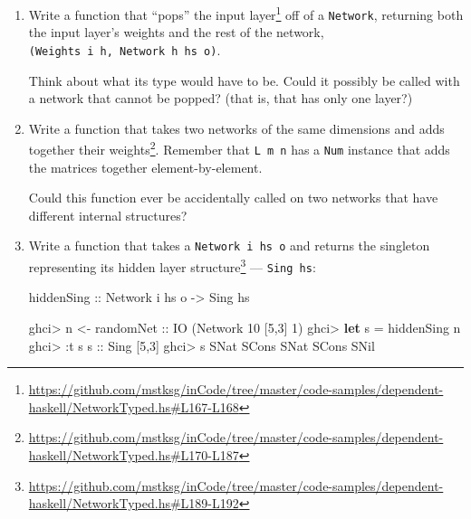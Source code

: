 \documentclass[]{article}
\newenvironment{Shaded}{}{}
\newcommand{\DataTypeTok}[1]{\textcolor[rgb]{0.56,0.13,0.00}{#1}}
\newcommand{\DecValTok}[1]{\textcolor[rgb]{0.25,0.63,0.44}{#1}}
\newcommand{\KeywordTok}[1]{\textcolor[rgb]{0.00,0.44,0.13}{\textbf{#1}}}
\newcommand{\NormalTok}[1]{#1}
\newcommand{\OperatorTok}[1]{\textcolor[rgb]{0.40,0.40,0.40}{#1}}
\newcommand{\OtherTok}[1]{\textcolor[rgb]{0.00,0.44,0.13}{#1}}
\renewcommand{\href}[2]{#2\footnote{\url{#1}}}
\begin{document}
\begin{enumerate}
\def\labelenumi{\arabic{enumi}.}
\item
  Write a function that
  \href{https://github.com/mstksg/inCode/tree/master/code-samples/dependent-haskell/NetworkTyped.hs\#L167-L168}{``pops''
  the input layer} off of a \texttt{Network}, returning both the input layer's
  weights and the rest of the network,
  \texttt{(Weights\ i\ h,\ Network\ h\ hs\ o)}.

  Think about what its type would have to be. Could it possibly be called with a
  network that cannot be popped? (that is, that has only one layer?)
\item
  Write a
  \href{https://github.com/mstksg/inCode/tree/master/code-samples/dependent-haskell/NetworkTyped.hs\#L170-L187}{function
  that takes two networks of the same dimensions and adds together their
  weights}. Remember that \texttt{L\ m\ n} has a \texttt{Num} instance that adds
  the matrices together element-by-element.

  Could this function ever be accidentally called on two networks that have
  different internal structures?
\item
  Write a function that takes a \texttt{Network\ i\ hs\ o} and
  \href{https://github.com/mstksg/inCode/tree/master/code-samples/dependent-haskell/NetworkTyped.hs\#L189-L192}{returns
  the singleton representing its hidden layer structure} --- \texttt{Sing\ hs}:

\begin{Shaded}
\begin{Highlighting}[]
\OtherTok{hiddenSing ::} \DataTypeTok{Network}\NormalTok{ i hs o }\OtherTok{{-}>} \DataTypeTok{Sing}\NormalTok{ hs}
\end{Highlighting}
\end{Shaded}

\begin{Shaded}
\begin{Highlighting}[]
\NormalTok{ghci}\OperatorTok{>}\NormalTok{ n }\OtherTok{<{-} randomNet ::} \DataTypeTok{IO}\NormalTok{ (}\DataTypeTok{Network} \DecValTok{10}\NormalTok{ \textquotesingle{}[}\DecValTok{5}\NormalTok{,}\DecValTok{3}\NormalTok{] }\DecValTok{1}\NormalTok{)}
\NormalTok{ghci}\OperatorTok{>} \KeywordTok{let}\NormalTok{ s }\OtherTok{=}\NormalTok{ hiddenSing n}
\NormalTok{ghci}\OperatorTok{>} \OperatorTok{:}\NormalTok{t s}
\OtherTok{s ::} \DataTypeTok{Sing}\NormalTok{ \textquotesingle{}[}\DecValTok{5}\NormalTok{,}\DecValTok{3}\NormalTok{]}
\NormalTok{ghci}\OperatorTok{>}\NormalTok{ s}
\DataTypeTok{SNat} \OtherTok{\textasciigrave{}SCons\textasciigrave{}} \DataTypeTok{SNat} \OtherTok{\textasciigrave{}SCons\textasciigrave{}} \DataTypeTok{SNil}
\end{Highlighting}
\end{Shaded}
\end{enumerate}
\end{document}
